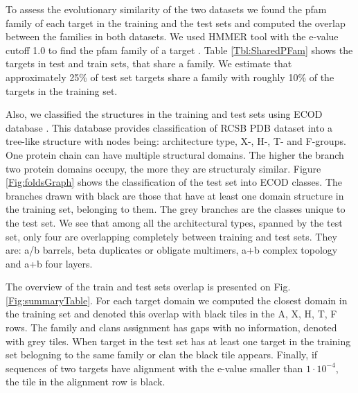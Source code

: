 \documentclass[a4paper,10pt]{article}
\begin{document}
To assess the evolutionary similarity of the two datasets we found the pfam family of each target in the training and the 
test sets and computed the overlap between the families in both datasets. We used HMMER tool with the e-value cutoff 1.0 to 
find the pfam family of a target \cite{finn2016pfam}. Table \ref{Tbl:SharedPFam} shows the targets in test and train sets, that share a family. We 
estimate that approximately 25\% of test set targets share a family with roughly 10\% of the targets in the training set.

Also, we classified the structures in the training and test sets using ECOD database \cite{cheng2014ecod}. This database provides classification of 
RCSB PDB dataset \cite{berman2000protein} into a tree-like structure with nodes being: architecture type, X-, H-, T- and F-groups. One 
protein chain can have multiple structural domains. 
The higher the branch two protein 
domains occupy, the more they are structuraly similar. Figure \ref{Fig:foldsGraph} shows the classification of the test set into ECOD classes. The 
branches drawn with black are those that have at least one domain structure in the training set, belonging to them. The grey branches are the 
classes unique to the test set. We see that among all the architectural types, spanned by the test set, only four are overlapping completely
between training and test sets. They are: a/b barrels, beta duplicates or obligate multimers, a+b complex topology and a+b four layers.

The overview of the train and test sets overlap is presented on Fig. \ref{Fig:summaryTable}. 
For each target domain we computed the closest domain in the 
training set and denoted this overlap with black tiles in the A, X, H, T, F rows. The family and clans assignment has gaps with no information, 
denoted with grey tiles. When target in the test set has at least one target in the training set belogning to the same family or clan the black 
tile appears. Finally, if sequences of two targets have alignment with the e-value smaller than $1\cdot10^{-4}$, the tile in the alignment row is 
black.
\end{document}
